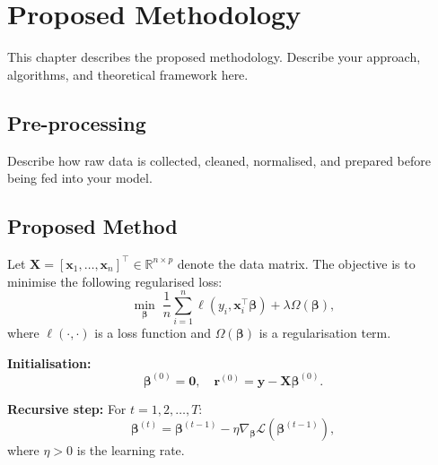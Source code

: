 \chapter{Proposed Methodology}
\label{chap:method}

This chapter describes the proposed methodology. Describe your
approach, algorithms, and theoretical framework here.

\section{Pre-processing}
\label{sec:preprocessing}

Describe how raw data is collected, cleaned, normalised, and prepared
before being fed into your model.

\section{Proposed Method}
\label{sec:proposed_method}

Let $\mathbf{X} = [\mathbf{x}_1, \ldots, \mathbf{x}_n]^\top \in
\mathbb{R}^{n \times p}$ denote the data matrix. The objective is
to minimise the following regularised loss:
\begin{equation}
  \min_{\boldsymbol{\beta}} \;\frac{1}{n}\sum_{i=1}^{n}
  \ell(y_i, \mathbf{x}_i^\top \boldsymbol{\beta}) +
  \lambda \Omega(\boldsymbol{\beta}),
\end{equation}
where $\ell(\cdot,\cdot)$ is a loss function and
$\Omega(\boldsymbol{\beta})$ is a regularisation term.

\begin{singlespace}
\noindent\textbf{Initialisation:}
\begin{equation}
  \boldsymbol{\beta}^{(0)} = \mathbf{0}, \quad
  \mathbf{r}^{(0)} = \mathbf{y} - \mathbf{X}\boldsymbol{\beta}^{(0)}.
\end{equation}

\noindent\textbf{Recursive step:} For $t = 1, 2, \ldots, T$:
\begin{equation}
  \boldsymbol{\beta}^{(t)} = \boldsymbol{\beta}^{(t-1)} -
  \eta \nabla_{\boldsymbol{\beta}} \mathcal{L}
  \!\left(\boldsymbol{\beta}^{(t-1)}\right),
\end{equation}
where $\eta > 0$ is the learning rate.
\end{singlespace}

